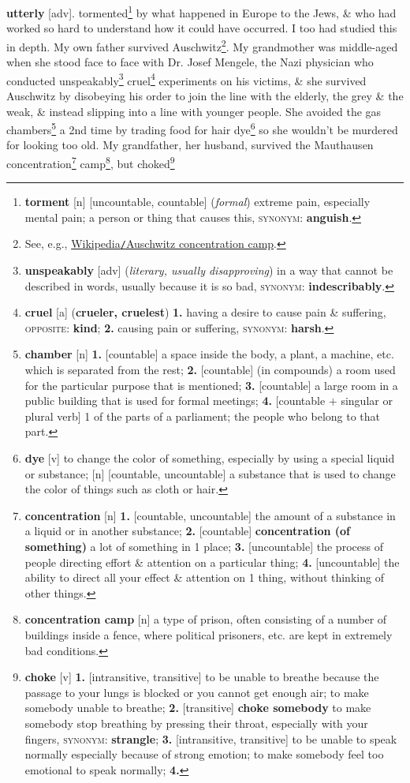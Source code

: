 \documentclass[oneside]{book}
\numberwithin{equation}{section}
\begin{document}
{\textbf{utterly} [adv].} tormented\footnote{\textbf{torment} [n] [uncountable, countable] (\textit{formal}) extreme pain, especially mental pain; a person or thing that causes this, \textsc{synonym}: \textbf{anguish}.} by what happened in Europe to the Jews, \& who had worked so hard to understand how it could have occurred. I too had studied this in depth. My own father survived Auschwitz\footnote{See, e.g., \href{https://en.wikipedia.org/wiki/Auschwitz_concentration_camp}{Wikipedia\texttt{/}Auschwitz concentration camp}.}. My grandmother was middle-aged when she stood face to face with Dr. Josef Mengele, the Nazi physician who conducted unspeakably\footnote{\textbf{unspeakably} [adv] (\textit{literary, usually disapproving}) in a way that cannot be described in words, usually because it is so bad, \textsc{synonym}: \textbf{indescribably}.} cruel\footnote{\textbf{cruel} [a] (\textbf{crueler, cruelest}) \textbf{1.} having a desire to cause pain \& suffering, \textsc{opposite}: \textbf{kind}; \textbf{2.} causing pain or suffering, \textsc{synonym}: \textbf{harsh}.} experiments on his victims, \& she survived Auschwitz by disobeying his order to join the line with the elderly, the grey \& the weak, \& instead slipping into a line with younger people. She avoided the gas chambers\footnote{\textbf{chamber} [n] \textbf{1.} [countable] a space inside the body, a plant, a machine, etc. which is separated from the rest; \textbf{2.} [countable] (in compounds) a room used for the particular purpose that is mentioned; \textbf{3.} [countable] a large room in a public building that is used for formal meetings; \textbf{4.} [countable $+$ singular or plural verb] 1 of the parts of a parliament; the people who belong to that part.} a 2nd time by trading food for hair dye\footnote{\textbf{dye} [v] to change the color of something, especially by using a special liquid or substance; [n] [countable, uncountable] a substance that is used to change the color of things such as cloth or hair.} so she wouldn't be murdered for looking too old. My grandfather, her husband, survived the Mauthausen concentration\footnote{\textbf{concentration} [n] \textbf{1.} [countable, uncountable] the amount of a substance in a liquid or in another substance; \textbf{2.} [countable] \textbf{concentration (of something)} a lot of something in 1 place; \textbf{3.} [uncountable] the process of people directing effort \& attention on a particular thing; \textbf{4.} [uncountable] the ability to direct all your effect \& attention on 1 thing, without thinking of other things.} camp\footnote{\textbf{concentration camp} [n] a type of prison, often consisting of a number of buildings inside a fence, where political prisoners, etc. are kept in extremely bad conditions.}, but choked\footnote{\textbf{choke} [v] \textbf{1.} [intransitive, transitive] to be unable to breathe because the passage to your lungs is blocked or you cannot get enough air; to make somebody unable to breathe; \textbf{2.} [transitive] \textbf{choke somebody} to make somebody stop breathing by pressing their throat, especially with your fingers, \textsc{synonym}: \textbf{strangle}; \textbf{3.} [intransitive, transitive] to be unable to speak normally especially because of strong emotion; to make somebody feel too emotional to speak normally; \textbf{4.} }
\end{document}
